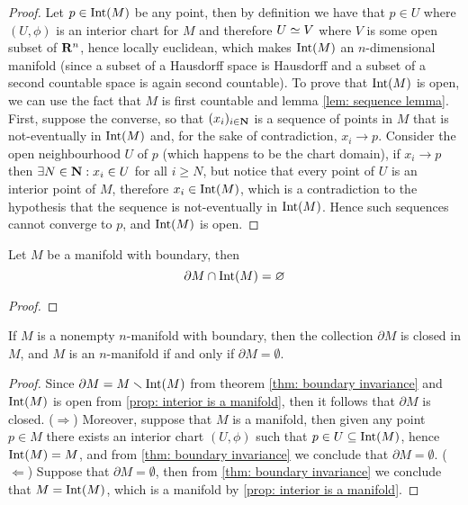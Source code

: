 \begin{proof}
Let \(p \in \operatorname{Int}(M)\) be any point, then by definition we have that \(p \in
U\) where \((U, \phi)\) is an interior chart for \(M\) and therefore \(U \simeq
V\) where \(V\) is some open subset of \(\mathbf{R}^n\), hence locally
euclidean, which makes \(\operatorname{Int}(M)\) an \(n\)-dimensional manifold (since a
subset of a Hausdorff space is Hausdorff and a subset of a second countable
space is again second countable). To prove that \(\operatorname{Int}(M)\) is open, we can
use the fact that \(M\) is first countable and lemma \cref{lem: sequence
lemma}. First, suppose the converse, so that \((x_i)_{i \in \mathbf{N}}\) is a
sequence of points in \(M\) that is not-eventually in \(\operatorname{Int}(M)\) and, for the
sake of contradiction, \(x_i \to p\). Consider the open neighbourhood \(U\) of
\(p\) (which happens to be the chart domain), if \(x_i \to p\) then \(\exists
N \in \mathbf{N}: x_i \in U\) for all \(i \geq N\), but notice that every
point of \(U\) is an interior point of \(M\), therefore \(x_i \in \operatorname{Int}(M)\),
which is a contradiction to the hypothesis that the sequence is not-eventually
in \(\operatorname{Int}(M)\). Hence such sequences cannot converge to \(p\), and \(\operatorname{Int}(M)\)
is open.
\end{proof}

\begin{theorem}\label{thm: boundary invariance}
Let \(M\) be a manifold with boundary, then
\[
  \partial M \cap \operatorname{Int}(M) = \varnothing
\]
\end{theorem}

\begin{proof}
\end{proof}

\begin{corollary}
If \(M\) is a nonempty \(n\)-manifold with boundary, then the collection
\(\partial M\) is closed in \(M\), and \(M\) is an \(n\)-manifold if and only
if \(\partial M = \emptyset\).
\end{corollary}

\begin{proof}
Since \(\partial M = M \smallsetminus \operatorname{Int}(M)\) from theorem \cref{thm: boundary
invariance} and \(\operatorname{Int}(M)\) is open from \cref{prop: interior is a manifold},
then it follows that \(\partial M\) is closed. (\(\Rightarrow\)) Moreover,
suppose that \(M\) is a manifold, then given any point \(p \in M\) there
exists an interior chart \((U, \phi)\) such that \(p \in U \subseteq
\operatorname{Int}(M)\), hence \(\operatorname{Int}(M) = M\), and from \cref{thm: boundary invariance} we
conclude that \(\partial M = \emptyset\). (\(\Leftarrow\)) Suppose that
\(\partial M = \emptyset\), then from \cref{thm: boundary invariance} we
conclude that \(M = \operatorname{Int}(M)\), which is a manifold by \cref{prop: interior is a
manifold}.
\end{proof}
